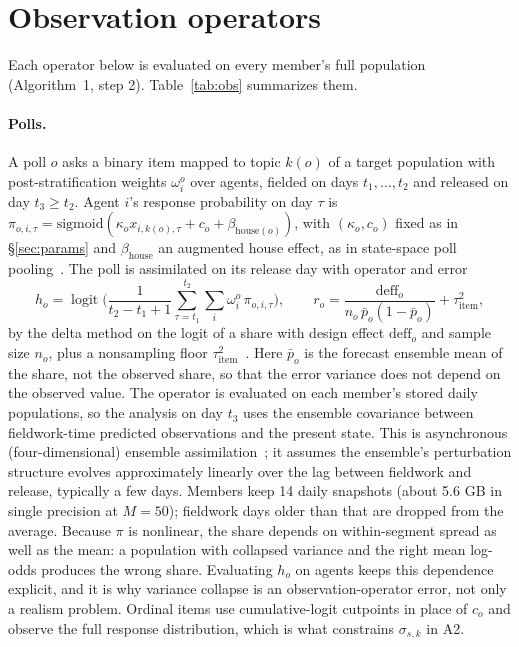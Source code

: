 \documentclass[10pt]{article}
\theoremstyle{remark}
\newcommand{\logit}{\operatorname{logit}}
\begin{document}
\section{Observation operators}
\label{sec:obs}

Each operator below is evaluated on every member's full population (Algorithm~1, step 2). Table~\ref{tab:obs} summarizes them.

\paragraph{Polls.} A poll $o$ asks a binary item mapped to topic $k(o)$ of a target population with post-stratification weights $\omega^o_i$ over agents, fielded on days $t_1,\dots,t_2$ and released on day $t_3\ge t_2$. Agent $i$'s response probability on day $\tau$ is $\pi_{o,i,\tau} = \mathrm{sigmoid}(\kappa_o x_{i,k(o),\tau} + c_o + \beta_{\mathrm{house}(o)})$, with $(\kappa_o,c_o)$ fixed as in \S\ref{sec:params} and $\beta_{\mathrm{house}}$ an augmented house effect, as in state-space poll pooling~\cite{jackman2005}. The poll is assimilated on its release day with operator and error
\begin{equation}
h_o = \logit\Big(\frac{1}{t_2-t_1+1}\sum_{\tau=t_1}^{t_2}\sum_i \omega^o_i\,\pi_{o,i,\tau}\Big),\qquad
r_o = \frac{\mathrm{deff}_o}{n_o\,\bar p_o(1-\bar p_o)} + \tau^2_{\mathrm{item}},
\end{equation}
by the delta method on the logit of a share with design effect $\mathrm{deff}_o$ and sample size $n_o$, plus a nonsampling floor $\tau^2_{\mathrm{item}}$~\cite{shiranimehr2018}. Here $\bar p_o$ is the forecast ensemble mean of the share, not the observed share, so that the error variance does not depend on the observed value. The operator is evaluated on each member's stored daily populations, so the analysis on day $t_3$ uses the ensemble covariance between fieldwork-time predicted observations and the present state. This is asynchronous (four-dimensional) ensemble assimilation~\cite{hunt2004}; it assumes the ensemble's perturbation structure evolves approximately linearly over the lag between fieldwork and release, typically a few days. Members keep 14 daily snapshots (about 5.6 GB in single precision at $M=50$); fieldwork days older than that are dropped from the average. Because $\pi$ is nonlinear, the share depends on within-segment spread as well as the mean: a population with collapsed variance and the right mean log-odds produces the wrong share. Evaluating $h_o$ on agents keeps this dependence explicit, and it is why variance collapse is an observation-operator error, not only a realism problem. Ordinal items use cumulative-logit cutpoints in place of $c_o$ and observe the full response distribution, which is what constrains $\sigma_{s,k}$ in A2.
\end{document}
